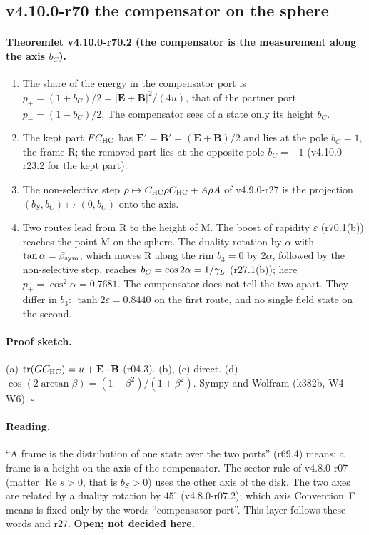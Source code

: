 \subsection*{v4.10.0-r70 the compensator on the sphere}
\label{subsec:v4100-r70-compensator}

\paragraph{Theoremlet v4.10.0-r70.2 (the compensator is the measurement along the axis \(b_C\)).}
\begin{enumerate}[leftmargin=2em]
\item[(a)] The share of the energy in the compensator port is \(p_+=(1+b_C)/2=|\mathbf E+\mathbf B|^2/(4u)\), that of the partner port
\(p_-=(1-b_C)/2\).  The compensator sees of a state only its height \(b_C\).
\item[(b)] The kept part \(FC_{\mathrm{HC}}\) has \(\mathbf E'=\mathbf B'=(\mathbf E+\mathbf B)/2\) and lies at the pole \(b_C=1\), the frame R; the
removed part lies at the opposite pole \(b_C=-1\) (v4.10.0-r23.2 for the kept part).
\item[(c)] The non-selective step \(\rho\mapsto C_{\mathrm{HC}}\rho C_{\mathrm{HC}}+A\rho A\) of v4.9.0-r27 is the projection \((b_S,b_C)\mapsto(0,b_C)\)
onto the axis.
\item[(d)] Two routes lead from R to the height of M.  The boost of rapidity \(\varepsilon\) (r70.1(b)) reaches the point M on the sphere.
The duality rotation by \(\alpha\) with \(\tan\alpha=\beta_{\mathrm{sym}}\), which moves R along the rim \(b_3=0\) by \(2\alpha\), followed by the
non-selective step, reaches \(b_C=\cos2\alpha=1/\gamma_L\) (r27.1(b)); here \(p_+=\cos^2\alpha=0.7681\).  The compensator does not tell the two
apart.  They differ in \(b_3\): \(\tanh2\varepsilon=0.8440\) on the first route, and no single field state on the second.
\end{enumerate}

\paragraph{Proof sketch.}
(a) \(\operatorname{tr}(GC_{\mathrm{HC}})=u+\mathbf E\cdot\mathbf B\) (r04.3).  (b), (c) direct.  (d) \(\cos(2\arctan\beta)=(1-\beta^2)/(1+\beta^2)\).
Sympy and Wolfram (k382b, W4--W6).  \(\square\)

\paragraph{Reading.}
``A frame is the distribution of one state over the two ports'' (r69.4) means: a frame is a height on the axis of the compensator.  The
sector rule of v4.8.0-r07 (matter \(\operatorname{Re}s>0\), that is \(b_S>0\)) uses the other axis of the disk.  The two axes are related by a
duality rotation by \(45^\circ\) (v4.8.0-r07.2); which axis Convention~F means is fixed only by the words ``compensator port''.  This layer
follows these words and r27.  \textbf{Open; not decided here.}

